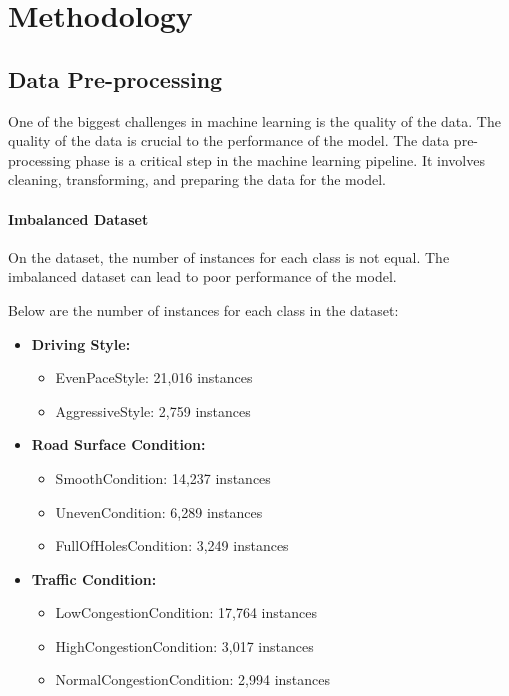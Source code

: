 \chapter{Methodology}

\section{Data Pre-processing}
One of the biggest challenges in machine learning is the quality of the data. The quality of the data is crucial to the performance of the model. 
The data pre-processing phase is a critical step in the machine learning pipeline. It involves cleaning, transforming, and preparing the data for the model. 

\subsubsection{Imbalanced Dataset}
On the dataset, the number of instances for each class is not equal. The imbalanced dataset can lead to poor performance of the model. 

Below are the number of instances for each class in the dataset:

\begin{itemize}
    \item \textbf{Driving Style:}
    \begin{itemize}
        \item EvenPaceStyle: 21,016 instances
        \item AggressiveStyle: 2,759 instances
    \end{itemize}
    \item \textbf{Road Surface Condition:}
    \begin{itemize}
        \item SmoothCondition: 14,237 instances
        \item UnevenCondition: 6,289 instances
        \item FullOfHolesCondition: 3,249 instances
    \end{itemize}
    \item \textbf{Traffic Condition:}
    \begin{itemize}
        \item LowCongestionCondition: 17,764 instances
        \item HighCongestionCondition: 3,017 instances
        \item NormalCongestionCondition: 2,994 instances
    \end{itemize}
\end{itemize}

